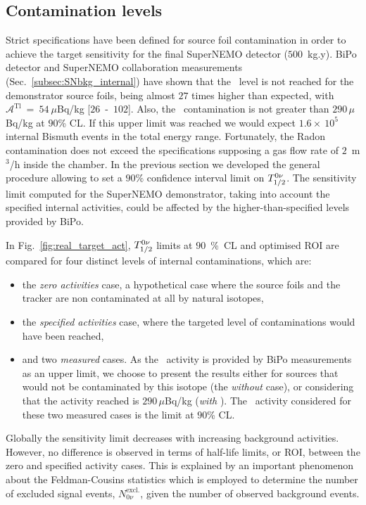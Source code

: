 \subsection{Contamination levels}
\label{subsec:Influence_cont}

Strict specifications have been defined for source foil contamination in order to achieve the target sensitivity for the final SuperNEMO detector ($500$~kg.y).
BiPo detector and SuperNEMO collaboration measurements (Sec.~\ref{subsec:SNbkg_internal}) have shown that the \Tl\ level is not reached for the demonstrator source foils, being almost $27$ times higher than expected, with $\mathcal{A}^{\text{Tl}}~=~54~\mu$Bq/kg [$26$~-~$102$].
Also, the \Bi\ contamination is not greater than $290\,\mu$Bq/kg at $90$\% CL.
If this upper limit was reached we would expect $1.6\times~10^{5}$ internal Bismuth events in the total energy range.
Fortunately, the Radon contamination does not exceed the specifications supposing a gas flow  rate of $2$~m$^{3}$/h inside the chamber.
In the previous section we developed the general procedure allowing to set a $90\%$ confidence interval limit on $T_{1/2}^{0\nu}$.
The sensitivity limit computed for the SuperNEMO demonstrator, taking into account the specified internal activities, could be affected by the higher-than-specified levels provided by BiPo.

In Fig.~\ref{fig:real_target_act}, $T_{1/2}^{0\nu}$ limits at $90$~\%~CL and optimised ROI are compared for four distinct levels of internal contaminations, which are:
\begin{itemize}
\item the \emph{zero activities} case, a hypothetical case where the source foils and the tracker are non contaminated at all by natural isotopes,
\item the \emph{specified activities} case, where the targeted level of contaminations would have been reached,
\item and two \emph{measured} cases.
  As the \Bi\ activity is provided by BiPo measurements as an upper limit, we choose to present the results either for sources that would not be contaminated by this isotope (the \emph{without \Bi} case), or considering that the activity reached is $290\,\mu$Bq/kg (\emph{with \Bi}).
  The \Tl\ activity considered for these two measured cases is the limit at $90$\% CL.
\end{itemize}
Globally the sensitivity limit decreases with increasing background activities.
However, no difference is observed in terms of half-life limits, or ROI, between the zero and specified activity cases.
This is explained by an important phenomenon about the Feldman-Cousins statistics which is employed to determine the number of excluded signal events, $N_{0\nu}^{\text{excl.}}$, given the number of observed background events.

